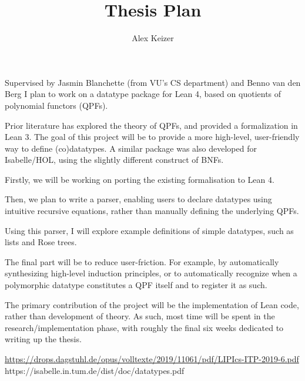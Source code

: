 \documentclass[a4paper]{article}
\title{Thesis Plan}
\author{Alex Keizer}
\date{}
\begin{document}
\maketitle

Supervised by Jasmin Blanchette (from VU's CS department) and Benno van den Berg I plan to work on a 
datatype package for Lean 4, based on quotients of polynomial functors (QPFs).

Prior literature has explored the theory of QPFs, and provided a formalization in Lean 3. \cite{qpf}
The goal of this project will be to provide a more high-level, user-friendly way to define (co)datatypes.
A similar package was also developed for Isabelle/HOL, using the slightly different construct of BNFs. \cite{isabelle}

Firstly, we will be working on porting the existing formalisation to Lean 4.

Then, we plan to write a parser, enabling users to declare datatypes using intuitive recursive equations,
rather than manually defining the underlying QPFs.

Using this parser, I will explore example definitions of simple datatypes, such as lists and Rose trees.

The final part will be to reduce user-friction.
For example, by automatically synthesizing high-level induction principles, or to automatically recognize when
a polymorphic datatype constitutes a QPF itself and to register it as such.


The primary contribution of the project will be the implementation of Lean code, 
rather than development of theory. 
As such, most time will be spent in the research/implementation phase, 
with roughly the final six weeks dedicated to writing up the thesis.

\begin{thebibliography}{10}
     \url{https://drops.dagstuhl.de/opus/volltexte/2019/11061/pdf/LIPIcs-ITP-2019-6.pdf}
     https://isabelle.in.tum.de/dist/doc/datatypes.pdf    
\end{thebibliography}
\end{document}
